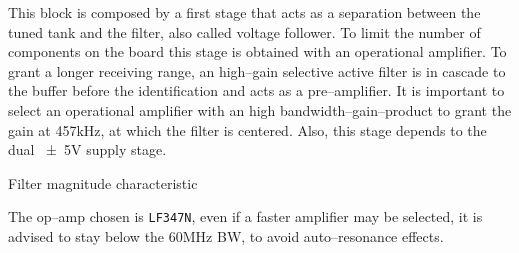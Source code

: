 This block is composed by a first stage that acts as a separation between the tuned tank and the filter, also called voltage follower. To limit the number of components on the board this stage is obtained with an operational amplifier. To grant a longer receiving range, an high--gain selective active filter is in cascade to the buffer before the identification and acts as a pre--amplifier. It is important to select an operational amplifier with an high bandwidth--gain--product to grant the gain at \num{457}\si{\kilo\hertz}, at which the filter is centered. Also, this stage depends to the dual \num{\pm 5}\si{\volt} supply stage. 
\begin{marginfigure}
	\centering
	\caption{Filter magnitude characteristic}
\end{marginfigure}

The op--amp chosen is \texttt{LF347N}, even if a faster amplifier may be selected, it is advised to stay below the \num{60}\si{\mega\hertz} BW, to avoid auto--resonance effects.

